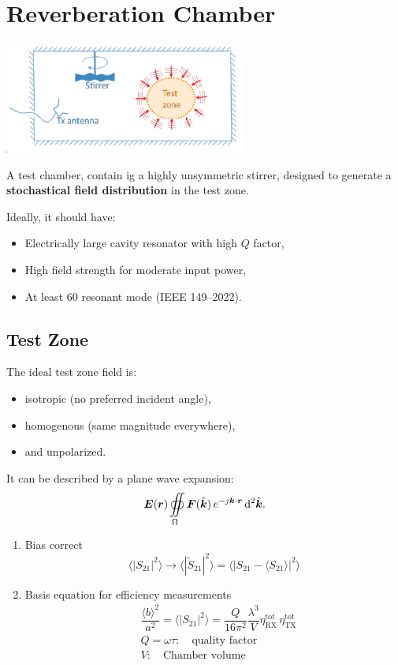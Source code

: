\section{Reverberation Chamber}
\includegraphics[width=8cm]{content/at_meas/pictures/reverberation_chamber}

A test chamber, contain ig a highly unsymmetric stirrer, designed to generate a \textbf{stochastical field distribution} in the test zone.

Ideally, it should have:
\begin{itemize}
  \item Electrically large cavity resonator with high $Q$ factor,
  \item High field strength for moderate input power,
  \item At least 60 resonant mode (IEEE 149--2022).
\end{itemize}

\subsection{Test Zone}
The ideal test zone field is:
\begin{itemize}
  \item isotropic (no preferred incident angle),
  \item homogenous (same magnitude everywhere),
  \item and unpolarized.
\end{itemize}

It can be described by a plane wave expansion:
\begin{equation}
  \boldsymbol{E}(\boldsymbol{r}) \oiint\limits_{\Omega} \boldsymbol{F}(\hat{\boldsymbol{k}}) \, e^{-j\boldsymbol{k}\cdot\boldsymbol{r}}\, \mathrm{d}^{2}\hat{\boldsymbol{k}}.
\end{equation}

\begin{enumerate}
  \item Bias correct
        \begin{equation*}
          \langle{|S_{21}|}^{2}\rangle \to \langle{|\tilde{S}_{21}|}^{2}\rangle = \langle{|S_{21} - \langle S_{21}\rangle|}^{2}\rangle
        \end{equation*}
  \item Basis equation for efficiency measurements
        \begin{align*}
          &\dfrac{{\langle b\rangle}^{2}}{a^{2}} = \langle {|S_{21}|}^{2} \rangle = \dfrac{Q}{16 \pi^{2}} \dfrac{\lambda^{3}}{V} \eta_{\text{RX}}^{\text{tot}} \, \eta_{\text{TX}}^{\text{tot}}\\
          &Q = \omega \tau : \quad \text{quality factor}\\
          &V : \quad \text{Chamber volume}
        \end{align*}
\end{enumerate}
